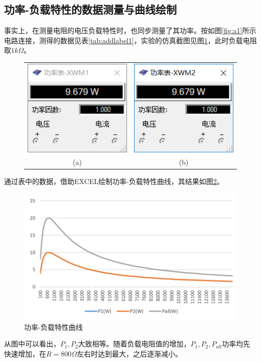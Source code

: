 \documentclass[12pt]{article}%
\begin{document}
\subsection{功率-负载特性的数据测量与曲线绘制}
事实上，在测量电阻的电压负载特性时，也同步测量了其功率。按如图\ref{fig:a1}所示电路连接，测得的数据见表\ref{tab:addlabel1}，实验的仿真截图见图\ref{fig:x11a8}，此时负载电阻取$1k\Omega$。
\begin{figure}[htbp]
\centering
\begin{tabular}{cc}
\includegraphics[width=0.3\linewidth]{TIM20180607120801.png}&
\includegraphics[width=0.3\linewidth]{TIM20180607120828.png}\\
(a)&(b)\\
\end{tabular}
\caption{\heiti{}}\label{fig:x11a8}
\end{figure}

通过表中的数据，借助EXCEL绘制功率-负载特性曲线，其结果如图\ref{fig:a121xs}。
\begin{figure}[htbp]
\centering\includegraphics[width=0.8\linewidth]{TIM20180531191301.png}
\caption{\heiti{}功率-负载特性曲线}\label{fig:a121xs}
\end{figure}
从图中可以看出，$P_1,P_2$大致相等。随着负载电阻值的增加，$P_1,P_2,P_{all}$功率均先快速增加，在$R=800\Omega$左右时达到最大，之后逐渐减小。
\end{document}
